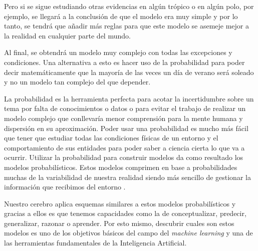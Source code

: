 Pero si se sigue estudiando otras evidencias en algún trópico o en algún polo, por ejemplo, se llegará a la conclusión de que el modelo era muy simple y por lo tanto, se tendrá que añadir más reglas para que este modelo se asemeje mejor a la realidad en cualquier parte del mundo.
\newline

Al final, se obtendrá un modelo muy complejo con todas las excepciones y condiciones. Una alternativa a esto es hacer uso de la probabilidad para poder decir matemáticamente que la mayoría de las veces un día de verano será soleado y no un modelo tan complejo del que depender. 
\newline

La probabilidad es la herramienta perfecta para acotar la incertidumbre sobre un tema por falta de conocimientos o datos o para evitar el trabajo de realizar un modelo complejo que conllevaría menor comprensión para la mente humana y dispersión en su aproximación. Poder usar una probabilidad es mucho más fácil que tener que estudiar todas las condiciones físicas de un entorno y el comportamiento de sus entidades para poder saber a ciencia cierta lo que va a ocurrir. Utilizar la probabilidad para construir modelos da como resultado los modelos probabilísticos. Estos modelos comprimen en base a probabilidades muchas de la variabilidad de nuestra realidad siendo más sencillo de gestionar la información que recibimos del entorno \cite{kuhne}.
\newline

Nuestro cerebro aplica esquemas similares a estos modelos probabilísticos y gracias a ellos es que tenemos capacidades como la de conceptualizar, predecir, generalizar, razonar o aprender. Por esto mismo, descubrir cuales son estos modelos es uno de los objetivos básicos del campo del \textit{machine learning} y una de las herramientas fundamentales de la Inteligencia Artificial.
\newline
